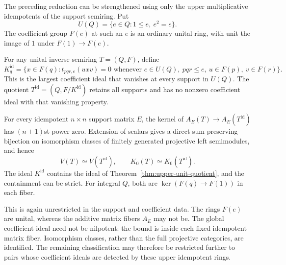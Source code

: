 The preceding reduction can be strengthened using only the upper
multiplicative idempotents of the support semiring. Put
\[
 U(Q)=\{e\in Q:1\leq e,\ e^2=e\}.
\]
The coefficient group $F(e)$ at such an $e$ is an ordinary unital ring,
with unit the image of $1$ under $F(1)\to F(e)$.

\begin{theorem}
\label{thm:upper-idempotent-quotient}
For any unital inverse semiring $T=(Q,F)$, define
\[
 K^{\mathrm{id}}_q=\{x\in F(q):t_{pqr,e}(uxv)=0
 \text{ whenever }e\in U(Q),\ pqr\leq e,
 \ u\in F(p),\ v\in F(r)\}.
\]
This is the largest coefficient ideal that vanishes at every support
in $U(Q)$. The quotient $T^{\mathrm{id}}=(Q,F/K^{\mathrm{id}})$
retains all supports and has no nonzero coefficient ideal with that
vanishing property.

For every idempotent $n\times n$ support matrix $E$, the kernel of
$A_E(T)\to A_E(T^{\mathrm{id}})$ has $(n+1)$st power zero.
Extension of scalars gives a direct-sum-preserving bijection on
isomorphism classes of finitely generated projective left semimodules,
and hence
\[
 V(T)\simeq V(T^{\mathrm{id}}),\qquad
 K_0(T)\simeq K_0(T^{\mathrm{id}}).
\]
The ideal $K^{\mathrm{id}}$ contains the ideal of
Theorem~\ref{thm:upper-unit-quotient}, and the containment can be strict.
For integral $Q$, both are $\ker(F(q)\to F(1))$ in each fiber.
\end{theorem}

This is again unrestricted in the support and coefficient data. The
rings $F(e)$ are unital, whereas the additive matrix fibers $A_E$ may
not be. The global coefficient ideal need not be nilpotent: the bound
is inside each fixed idempotent matrix fiber. Isomorphism classes,
rather than the full projective categories, are identified. The
remaining classification may therefore be restricted further to pairs
whose coefficient ideals are detected by these upper idempotent rings.
